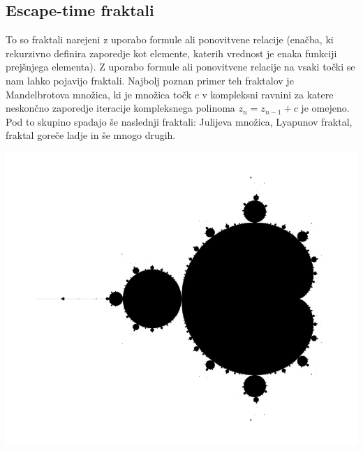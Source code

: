 \documentclass[a4paper, 12px]{article}
\begin{document}
    \subsection{Escape-time fraktali}
        To so fraktali narejeni z uporabo formule ali ponovitvene relacije (enačba, ki rekurzivno definira zaporedje kot elemente, katerih vrednost je enaka funkciji prejšnjega elementa).
        Z uporabo formule ali ponovitvene relacije na vsaki točki se nam lahko pojavijo fraktali.
        Najbolj poznan primer teh fraktalov je Mandelbrotova množica, ki je množica točk $c$ v kompleksni ravnini za katere neskončno zaporedje iteracije kompleksnega polinoma $z_n=z_{n-1}+c$ je omejeno.
        Pod to skupino spadajo še naslednji fraktali: Julijeva množica, Lyapunov fraktal, fraktal goreče ladje in še mnogo drugih.
        \cite{FractalDefinition}
        \cite{MandelbrotSet}
        \centerline{\includegraphics[scale=1.2]{mandelbrot-set.png}}
        \begingroup
        \endgroup

\listoffigures
\printbibliography
\end{document}
